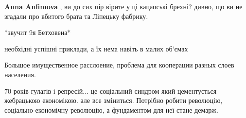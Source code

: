 \begin{itemize}
\begin{itemize}
\textbf{Anna Anfimova} , ви до сих пір вірите у ці кацапські брехні? дивно, що ви не згадали про вбитого брата та Ліпецьку фабрику.
\end{itemize} %

*звучит 9я Бетховена*

необхідні успішні приклади, а їх нема навіть в малих об'ємах

Большое имущественное расслоение, проблема для кооперации разных слоев населения.


70 років гулагів і репресій... це соціальний синдром який цементується
жебрацькою економікою.  але все зміниться. Потрібно робити революцію,
соціально-економічну революцію, а фундаментом для неї стане демарж.



\end{itemize} %
